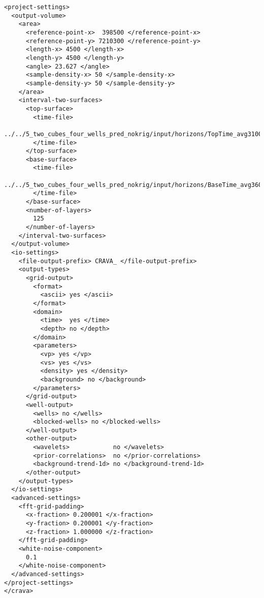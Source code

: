 \documentclass[screen,note,long,backref,indentpar]{nrdoc}
\begin{document}
\begin{small}
\begin{verbatim}
<project-settings>
  <output-volume>
    <area>
      <reference-point-x>  398500 </reference-point-x>
      <reference-point-y> 7210300 </reference-point-y>
      <length-x> 4500 </length-x>
      <length-y> 4500 </length-y>
      <angle> 23.627 </angle>
      <sample-density-x> 50 </sample-density-x>
      <sample-density-y> 50 </sample-density-y>
    </area>
    <interval-two-surfaces>
      <top-surface>
        <time-file>
          ../../5_two_cubes_four_wells_pred_nokrig/input/horizons/TopTime_avg3100ms.storm
        </time-file>
      </top-surface>
      <base-surface>
        <time-file>
          ../../5_two_cubes_four_wells_pred_nokrig/input/horizons/BaseTime_avg3600ms.storm
        </time-file>
      </base-surface>
      <number-of-layers>
        125
      </number-of-layers>
    </interval-two-surfaces>
  </output-volume>
  <io-settings>
    <file-output-prefix> CRAVA_ </file-output-prefix>
    <output-types>
      <grid-output>
        <format>
          <ascii> yes </ascii>
        </format>
        <domain>
          <time>  yes </time>
          <depth> no </depth>
        </domain>
        <parameters>
          <vp> yes </vp>
          <vs> yes </vs>
          <density> yes </density>
          <background> no </background>
        </parameters>
      </grid-output>
      <well-output>
        <wells> no </wells>
        <blocked-wells> no </blocked-wells>
      </well-output>
      <other-output>
        <wavelets>            no </wavelets>
        <prior-correlations>  no </prior-correlations>
        <background-trend-1d> no </background-trend-1d>
      </other-output>
    </output-types>
  </io-settings>
  <advanced-settings>
    <fft-grid-padding>
      <x-fraction> 0.200001 </x-fraction>
      <y-fraction> 0.200001 </y-fraction>
      <z-fraction> 1.000000 </z-fraction>
    </fft-grid-padding>
    <white-noise-component>
      0.1
    </white-noise-component>
  </advanced-settings>
</project-settings>
</crava>

\end{verbatim}
\end{small}



\end{document}
